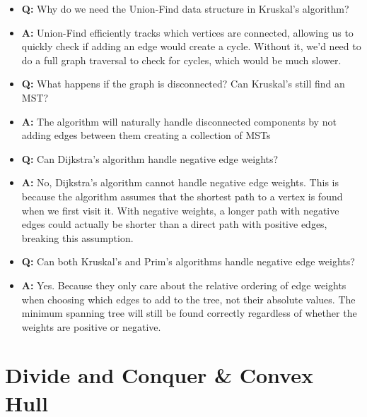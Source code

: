 \documentclass[11pt,a4paper]{article}
\begin{document}
\begin{multicols}{2}
\begin{itemize}
    \item \textbf{Q:} Why do we need the Union-Find data structure in Kruskal's algorithm?
    \item \textbf{A:} Union-Find efficiently tracks which vertices are connected, allowing us to quickly check if adding an edge would create a cycle. Without it, we'd need to do a full graph traversal to check for cycles, which would be much slower.

    \item \textbf{Q:} What happens if the graph is disconnected? Can Kruskal's still find an MST?
    \item \textbf{A:} The algorithm will naturally handle disconnected components by not adding edges between them creating a collection of MSTs

    \item \textbf{Q:} Can Dijkstra's algorithm handle negative edge weights?
    \item \textbf{A:} No, Dijkstra's algorithm cannot handle negative edge weights. This is because the algorithm assumes that the shortest path to a vertex is found when we first visit it. With negative weights, a longer path with negative edges could actually be shorter than a direct path with positive edges, breaking this assumption.

    \item \textbf{Q:} Can both Kruskal's and Prim's algorithms handle negative edge weights?
    \item \textbf{A:} Yes. Because they only care about the relative ordering of edge weights when choosing which edges to add to the tree, not their absolute values. The minimum spanning tree will still be found correctly regardless of whether the weights are positive or negative.
\end{itemize}

\section{Divide and Conquer \& Convex Hull}

\end{multicols}
\end{document}
